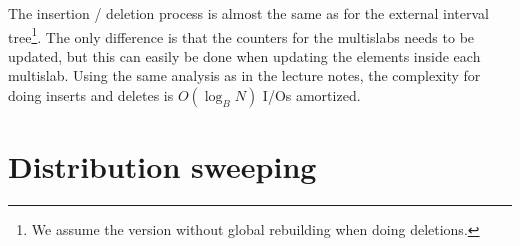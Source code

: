 \documentclass[a4paper,12pt]{article}
\begin{document}
The insertion / deletion process is almost the same as for the external interval tree\footnote{We assume the version without global rebuilding when doing deletions.}. The only difference is that the counters for the multislabs needs to be updated, but this can easily be done when updating the elements inside each multislab. Using the same analysis as in the lecture notes, the complexity for doing inserts and deletes is $O(\log_B N)$ I/Os amortized.

\pagebreak
\section{Distribution sweeping}



%
\end{document}
